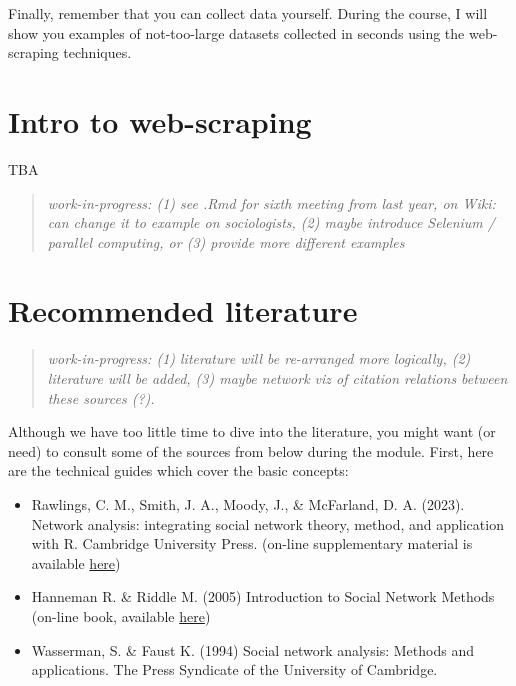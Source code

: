 \documentclass[
]{book}
\begin{document}
Finally, remember that you can collect data yourself. During the course, I will show you examples of not-too-large datasets collected in seconds using the web-scraping techniques.

\chapter*{\texorpdfstring{\textbf{Intro to web-scraping}}{Intro to web-scraping}}\label{intro-to-web-scraping}

TBA

\begin{quote}
\emph{work-in-progress: (1) see .Rmd for sixth meeting from last year, on Wiki: can change it to example on sociologists, (2) maybe introduce Selenium / parallel computing, or (3) provide more different examples}
\end{quote}

\chapter*{\texorpdfstring{\textbf{Recommended literature}}{Recommended literature}}\label{recommended-literature}

\begin{quote}
\emph{work-in-progress: (1) literature will be re-arranged more logically, (2) literature will be added, (3) maybe network viz of citation relations between these sources (?). }
\end{quote}

Although we have too little time to dive into the literature, you might want (or need) to consult some of the sources from below during the module. First, here are the technical guides which cover the basic concepts:

\begin{itemize}
\item
  Rawlings, C. M., Smith, J. A., Moody, J., \& McFarland, D. A. (2023). Network analysis: integrating social network theory, method, and application with R. Cambridge University Press.
  (on-line supplementary material is available \href{https://inarwhal.github.io/NetworkAnalysisR-book/}{here})
\item
  Hanneman R. \& Riddle M. (2005) Introduction to Social Network Methods
  (on-line book, available \href{https://faculty.ucr.edu/~hanneman/nettext/index.html}{here})
\item
  Wasserman, S. \& Faust K. (1994) Social network analysis: Methods and applications. The Press Syndicate of the University of Cambridge.
\end{itemize}
\end{document}
